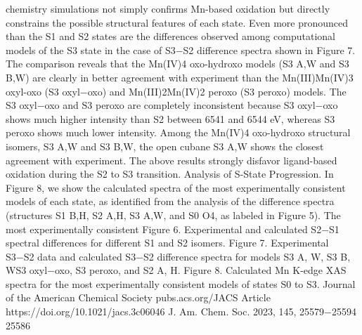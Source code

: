 \documentclass{article}
\begin{document}
chemistry simulations not simply confirms Mn-based oxidation
but directly constrains the possible structural features of each
state.
Even more pronounced than the S1 and S2 states are the
differences observed among computational models of the S3
state in the case of S3−S2 difference spectra shown in Figure 7.
The comparison reveals that the Mn(IV)4 oxo-hydroxo models
(S3
A,W and S3
B,W) are clearly in better agreement with
experiment than the Mn(III)Mn(IV)3 oxyl-oxo (S3
oxyl−oxo)
and Mn(III)2Mn(IV)2 peroxo (S3
peroxo) models. The S3
oxyl−oxo
and S3
peroxo are completely inconsistent because S3
oxyl−oxo
shows much higher intensity than S2 between 6541 and
6544 eV, whereas S3
peroxo shows much lower intensity. Among
the Mn(IV)4 oxo-hydroxo structural isomers, S3
A,W and S3
B,W,
the open cubane S3
A,W shows the closest agreement with
experiment. The above results strongly disfavor ligand-based
oxidation during the S2 to S3 transition.
Analysis of S-State Progression. In Figure 8, we show
the calculated spectra of the most experimentally consistent
models of each state, as identified from the analysis of the
difference spectra (structures S1
B,H, S2
A,H, S3
A,W, and S0
O4, as
labeled in Figure 5). The most experimentally consistent
Figure 6. Experimental and calculated S2−S1 spectral differences for
different S1 and S2 isomers.
Figure 7. Experimental S3−S2 data and calculated S3−S2 difference
spectra for models S3
A, W, S3
B, WS3
oxyl−oxo, S3
peroxo, and S2
A, H.
Figure 8. Calculated Mn K-edge XAS spectra for the most
experimentally consistent models of states S0 to S3.
Journal of the American Chemical Society
pubs.acs.org/JACS
Article
https://doi.org/10.1021/jacs.3c06046
J. Am. Chem. Soc. 2023, 145, 25579−25594
25586

\newpage

\end{document}
